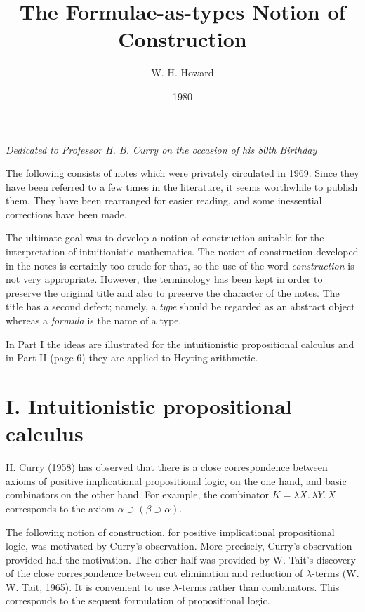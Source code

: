 \documentclass[12pt]{article}
\date{}
\title{The Formulae-as-types Notion of Construction}
\author{W. H. Howard}
\date{1980}
\def\l{\lambda}
\def\limp{\supset}
\def\a{\alpha}
\def\b{\beta}
\begin{document}
\maketitle
\bigskip
\begin{center}
{\small\it Dedicated to Professor H. B. Curry on the occasion of his 80th Birthday}
\end{center}
\bigskip

\medskip
\noindent
The following consists of notes which were privately circulated in 1969. Since they have been referred to a few times in the literature, it seems worthwhile to publish them. They have been rearranged for easier reading, and some inessential corrections have been made.

The ultimate goal was to develop a notion of construction suitable for the interpretation of intuitionistic mathematics. The notion of construction developed in the notes is certainly too crude for that, so the use of the word {\it construction} is not very appropriate. However, the terminology has been kept in order to preserve the original title and also to preserve the character of the notes. The title has a second defect; namely, a {\it type} should be regarded as an abstract object whereas a {\it formula} is the name of a type.

In Part I the ideas are illustrated for the intuitionistic propositional calculus and in Part II (page 6) they are applied to Heyting arithmetic.

\section*{I. Intuitionistic propositional calculus}

H. Curry (1958) has observed that there is a close correspondence between axioms of positive implicational propositional logic, on the one hand, and basic combinators on the other hand. For example, the combinator $K = \l X.\,\l Y.\,X$ corresponds to the axiom $\a \limp (\b \limp \a)$.

The following notion of construction, for positive implicational propositional logic, was motivated by Curry's observation. More precisely, Curry's observation provided half the motivation. The other half was provided by W. Tait's discovery of the close correspondence between cut elimination and reduction of $\l$-terms (W. W. Tait, 1965). It is convenient to use $\l$-terms rather than combinators. This corresponds to the sequent formulation of propositional logic.
\end{document}
